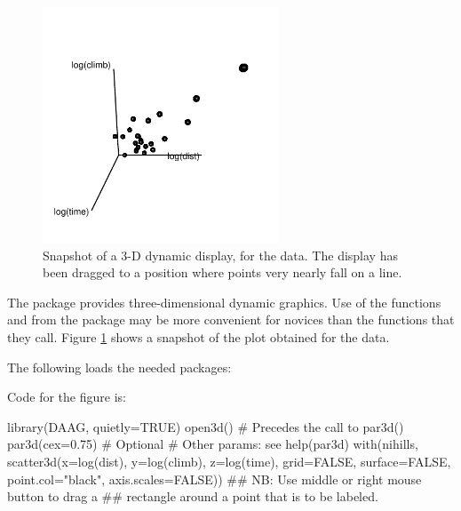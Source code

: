 \begin{figure}
\begin{Schunk}


\centerline{\includegraphics[width=0.625\textwidth]{figs/07-rgl-demo-1} }

\end{Schunk}
\caption{Snapshot of a 3-D dynamic display, for the 
 data.  The display has been dragged to a
position where points very nearly fall on a line.}\label{fig:rgl-ex}
\end{figure}

The  package provides three-dimensional dynamic graphics.
Use of the functions  and  from
the  package may be more convenient for novices than the
 functions that they call.
Figure \ref{fig:rgl-ex} shows a snapshot of the plot obtained for the
 data.

\noindent
The following loads the needed packages:
\begin{Schunk}
\end{Schunk}

\noindent Code for the figure is:
\begin{Schunk}
\begin{Sinput}
library(DAAG, quietly=TRUE)
open3d()            # Precedes the call to par3d()
par3d(cex=0.75)     # Optional
                    # Other params: see help(par3d)
with(nihills, scatter3d(x=log(dist), y=log(climb),
                        z=log(time),
                        grid=FALSE,
                        surface=FALSE,
                        point.col="black",
                        axis.scales=FALSE))
## NB: Use middle or right mouse button to drag a
## rectangle around a point that is to be labeled.
\end{Sinput}
\end{Schunk}


